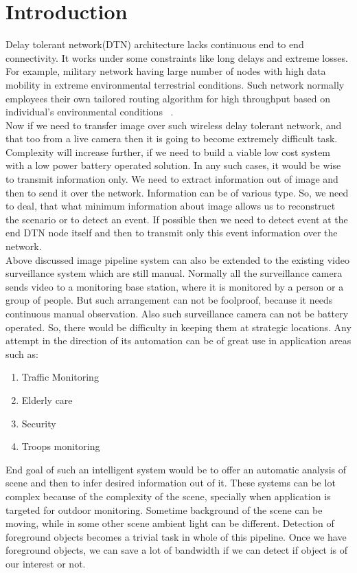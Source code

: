 
\chapter{Introduction} %
\label{Chapter1}

\indent Delay tolerant network(DTN) architecture lacks continuous end to end
connectivity. It works under some constraints like long delays and
extreme losses. For example, military network having large number of
nodes with high data mobility in extreme environmental terrestrial
conditions. Such network normally employees their own tailored routing
algorithm for high throughput based on individual's environmental
conditions ~\cite{1}.\\

\indent Now if we need to transfer image over such wireless delay tolerant
network, and that too from a live camera then it is going to become
extremely difficult task. Complexity will increase further, if we need
to build a viable low cost system with a low power battery operated
solution.  In any such cases, it would be wise to transmit
information only. We need to extract information out of image and then to
send it over the network.  Information can be of various type. So, we
need to deal, that what minimum information about image allows us to
reconstruct the scenario or to detect an event. If possible then we 
need to detect event at the end DTN node itself and then to transmit
only this event information over the network.\\

\indent Above discussed image pipeline system can also be extended to the
existing video surveillance system which are still manual. Normally all
the surveillance camera sends video to a monitoring base station, where
it is monitored by a person or a group of people. But such arrangement
can not be foolproof, because it needs continuous manual observation.
Also such surveillance camera can not be battery operated.  So, there
would be difficulty in keeping them at strategic locations.  Any attempt
in the direction of its automation can be of great use in application
areas such as:\\
\begin{enumerate}
 \item  Traffic Monitoring
  \item Elderly care
  \item Security
  \item Troops monitoring
\end{enumerate}
\indent End goal of such an intelligent system would be to offer an
automatic analysis of scene and then to infer desired information out of
it. These systems can be lot complex because of the complexity of the
scene, specially when application is targeted for outdoor monitoring.
Sometime background of the scene can be moving, while in some other
scene ambient light can be different. Detection of foreground objects
becomes a trivial task in whole of this pipeline. Once we have
foreground objects, we can save a lot of bandwidth if we can detect if
object is of our interest or not.\\


